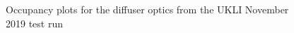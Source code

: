 \begin{figure}
\end{figure}


\begin{figure}
    \centering
    
    \caption{Occupancy plots for the diffuser optics from the UKLI November 2019 test run} \label{fig:occupancy_diffuser} 
    

\end{figure}
